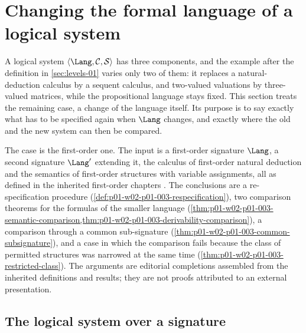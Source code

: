 \section{Changing the formal language of a logical system}
\label{sec:p01-w02-p01-003-language-change}

A logical system \(\langle\Lang,\mathcal C,\mathcal S\rangle\) has three
components, and the example after the definition in
\cref{sec:levels-01} varies only two of them: it replaces a
natural-deduction calculus by a sequent calculus, and two-valued valuations
by three-valued matrices, while the propositional language stays fixed.
This section treats the remaining case, a change of the language itself.
Its purpose is to say exactly what has to be specified again when
\(\Lang\) changes, and exactly where the old and the new system can then be
compared.

The case is the first-order one. The input is a first-order signature
\(\Lang\), a second signature \(\Lang'\) extending it, the calculus of
first-order natural deduction and the semantics of first-order structures
with variable assignments, all as defined in the inherited first-order
chapters \cite[chs.~``First-Order Syntax'', ``Structures, Satisfaction, and
Translation'', ``First-Order Deduction'']{FrozenFormalLogicLanguageChange}.
The conclusions are a re-specification procedure
(\cref{def:p01-w02-p01-003-respecification}), two comparison theorems for the
formulas of the smaller language
(\cref{thm:p01-w02-p01-003-semantic-comparison,thm:p01-w02-p01-003-derivability-comparison}),
a comparison through a common sub-signature
(\cref{thm:p01-w02-p01-003-common-subsignature}), and a case in which the
comparison fails because the class of permitted structures was narrowed at the
same time (\cref{thm:p01-w02-p01-003-restricted-class}). The arguments are
editorial completions assembled from the inherited definitions and results;
they are not proofs attributed to an external presentation.

\subsection{The logical system over a signature}
\label{sec:p01-w02-p01-003-system-over-signature}

